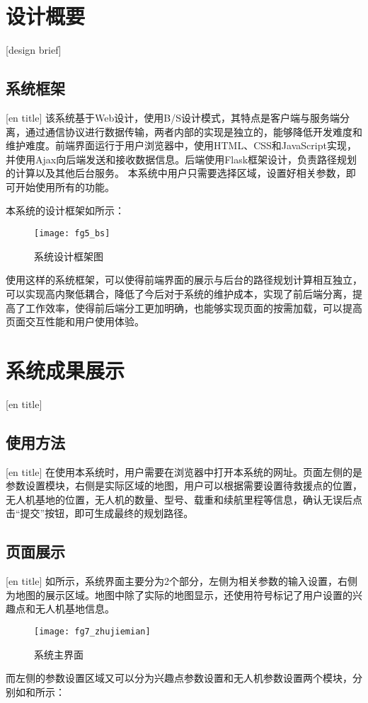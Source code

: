 \section{设计概要}[design brief]
\subsection{系统框架}[en title]
该系统基于Web设计，使用B/S设计模式，其特点是客户端与服务端分离，通过通信协议进行数据传输，两者内部的实现是独立的，能够降低开发难度和维护难度。前端界面运行于用户浏览器中，使用HTML、CSS和JavaScript实现，并使用Ajax向后端发送和接收数据信息。后端使用Flask框架设计，负责路径规划的计算以及其他后台服务。
本系统中用户只需要选择区域，设置好相关参数，即可开始使用所有的功能。


本系统的设计框架如所示：

\begin{figure}[ht]
	\centering
	\texttt{[image: fg5\_bs]}
	\caption{系统设计框架图}
	\label{fg601}
\end{figure}


使用这样的系统框架，可以使得前端界面的展示与后台的路径规划计算相互独立，可以实现高内聚低耦合，降低了今后对于系统的维护成本，实现了前后端分离，提高了工作效率，使得前后端分工更加明确，也能够实现页面的按需加载，可以提高页面交互性能和用户使用体验。

\section{系统成果展示}[en title]
\subsection{使用方法}[en title]
在使用本系统时，用户需要在浏览器中打开本系统的网址。页面左侧的是参数设置模块，右侧是实际区域的地图，用户可以根据需要设置待救援点的位置，无人机基地的位置，无人机的数量、型号、载重和续航里程等信息，确认无误后点击“提交”按钮，即可生成最终的规划路径。
\subsection{页面展示}[en title]
如所示，系统界面主要分为2个部分，左侧为相关参数的输入设置，右侧为地图的展示区域。地图中除了实际的地图显示，还使用符号标记了用户设置的兴趣点和无人机基地信息。

\begin{figure}[H]
	\centering
	\texttt{[image: fg7\_zhujiemian]}
	\caption{系统主界面}
	\label{fg602}
\end{figure}
而左侧的参数设置区域又可以分为兴趣点参数设置和无人机参数设置两个模块，分别如和所示：

